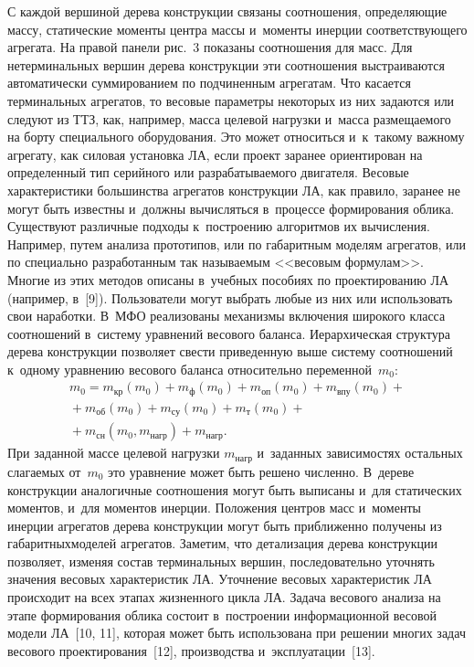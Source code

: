 \begin{multicols}{2}
  С каждой вершиной дерева конструкции связаны соотношения, 
определяющие массу, статические моменты цент\-ра массы и~моменты инерции 
соответствующего агрегата. На правой панели рис.~3 показаны соотношения 
для масс. Для нетерминальных вершин дерева конструкции эти соотношения 
выстраиваются автоматически суммированием по подчиненным агрегатам. Что 
касается терминальных агрегатов, то весовые па\-ра\-мет\-ры некоторых из них 
задаются или следуют из ТТЗ, как, например, масса целевой нагрузки и~масса 
размещаемого на борту специального оборудования. Это может относиться 
и~к~такому важ\-но\-му агрегату, как силовая установка ЛА, если проект заранее 
ориентирован на определенный тип серийного или раз\-ра\-ба\-ты\-ва\-емо\-го 
двигателя. Весовые характеристики большинства агрегатов конструкции ЛА, 
как правило, заранее не могут быть известны и~должны вы\-чис\-лять\-ся в~процессе 
формирования облика. Существуют различные подходы к~по\-стро\-ению 
алгоритмов их вы\-чис\-ле\-ния. Например, путем анализа прототипов, или по 
габаритным моделям агрегатов, или по специально разработанным так 
называемым <<весовым формулам>>. Многие из этих методов описаны 
в~учебных пособиях по проектированию ЛА (например, в~[9]). Пользователи 
могут выбрать любые из них или использовать свои наработки. В~МФО 
реализованы механизмы включения широкого класса соотношений в~систему 
уравнений весового баланса. Иерархическая структура дерева конструкции 
позволяет свести приведенную выше сис\-те\-му соотношений к~одному 
уравнению весового баланса относительно переменной~$m_0$:
  \begin{multline*}
  m_0=m_{\mathrm{кр}}(m_0) +m_{\mathrm{ф}}(m_0) +
  m_{\mathrm{оп}}(m_0)+ m_{\mathrm{впу}}(m_0)+{}\\
  {}+ m_{\mathrm{об}}(m_0)+ m_{\mathrm{су}}(m_0)+ 
m_{\mathrm{т}}(m_0)+ {}\\
{}+m_{\mathrm{сн}}(m_0, m_{\mathrm{нагр}}) + 
m_{\mathrm{нагр}}.
  \end{multline*}
%
При заданной массе целевой нагрузки $ m_{\mathrm{нагр}}$ и~заданных 
зависимостях остальных слагаемых от~$m_0$ это уравнение может быть 
решено чис\-лен\-но. В~дереве конструкции аналогичные соотношения могут 
быть выписаны и~для статических моментов, и~для моментов инерции. 
Положения цент\-ров масс и~моменты инерции агрегатов дерева конструкции 
могут быть приближенно получены из габаритных\linebreak моделей агрегатов. Заметим, 
что детализация дерева конструкции позволяет, изменяя со\-став терминальных вершин, 
последовательно уточнять значения весовых характеристик ЛА. 
Уточнение \mbox{весовых} характеристик ЛА происходит на всех этапах жизненного 
цикла ЛА. Задача весового анализа на этапе формирования облика состоит 
в~построении информационной весовой модели ЛА~[10, 11], которая может 
быть использована при решении многих задач весового проектирования~[12], 
производства и~эксплуатации~[13].


\end{multicols}
